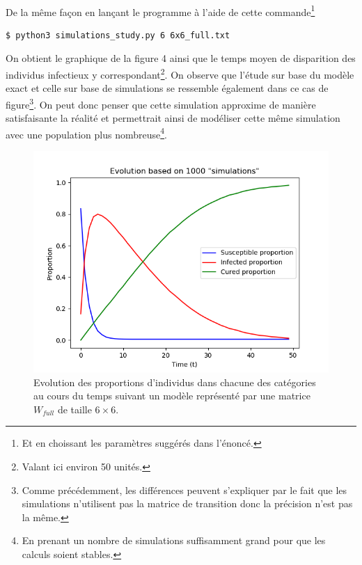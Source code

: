 \documentclass[a4paper, 12pt, oneside]{article}
\begin{document}
\paragraph{}De la même façon en lançant le programme à l'aide de cette commande\footnote{Et en choissant les paramètres suggérés dans l'énoncé.}
\begin{lstlisting}[language=bash]
$ python3 simulations_study.py 6 6x6_full.txt 
\end{lstlisting}

\noindent On obtient le graphique de la figure 4 ainsi que le temps moyen de disparition des individus infectieux y correspondant\footnote{Valant ici environ 50 unités.}. On observe que l'étude sur base du modèle exact et celle sur base de simulations se ressemble également dans ce cas de figure\footnote{Comme précédemment, les différences peuvent s'expliquer par le fait que les simulations n'utilisent pas la matrice de transition donc la précision n'est pas la même.}. On peut donc penser que cette simulation approxime de manière satisfaisante la réalité et permettrait ainsi de modéliser cette même simulation avec une population plus nombreuse\footnote{En prenant un nombre de simulations suffisamment grand pour que les calculs soient stables.}.

\begin{figure}[H]
	\centering
	\includegraphics[scale=1]{full_6x6_simulations.png} 
	\caption{Evolution des proportions d'individus dans chacune des catégories au cours du temps suivant un modèle représenté par une matrice $W_{full}$ de taille $6 \times 6$.}
\end{figure}
\end{document}
